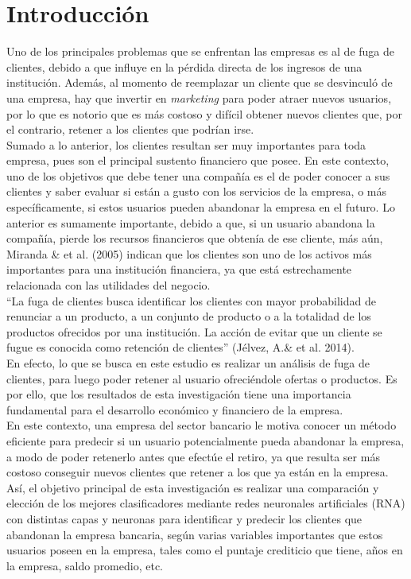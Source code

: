 \documentclass{report}
\begin{document}


\tableofcontents
\chapter{Introducción}\label{intro}
Uno de los principales problemas que se enfrentan las empresas es al de fuga de clientes, debido a que
influye en la pérdida directa de los ingresos de una institución. Además, al momento de reemplazar un cliente
que se desvinculó de una empresa, hay que invertir en \textit{marketing} para poder atraer nuevos usuarios, por lo
que es notorio que es más costoso y difícil obtener nuevos clientes que, por el contrario, retener a los clientes
que podrían irse.\\

Sumado a lo anterior, los clientes resultan ser muy importantes para toda empresa, pues son el principal sustento financiero que posee. En este contexto, uno de los objetivos que debe tener una compañía
es el de poder conocer a sus clientes y saber evaluar si están
a gusto con los servicios de la empresa, o más
específicamente, si estos usuarios pueden abandonar la
empresa en el futuro. Lo anterior es sumamente importante,
debido a que, si un usuario abandona la compañía, pierde
los recursos financieros que obtenía de ese cliente, más aún,
Miranda  \& et al. (2005) indican que los clientes son uno
de los activos más importantes para una institución
financiera, ya que está estrechamente relacionada con las
utilidades del negocio.\\

``La fuga de clientes busca identificar los clientes con mayor probabilidad de renunciar a un producto, a un conjunto de producto o a la totalidad de los productos ofrecidos por una institución. La acción de evitar que un cliente se fugue es conocida como retención de clientes” (Jélvez, A.\& et al. 2014).\\

En efecto, lo que se busca en este estudio es realizar un análisis de fuga de clientes, para luego poder retener al usuario ofreciéndole ofertas o productos. Es por ello, que los resultados de esta investigación tiene una importancia fundamental para el desarrollo económico y financiero de la empresa.\\



En este contexto, una empresa del sector bancario le motiva conocer un método eficiente para predecir si un usuario
potencialmente pueda abandonar la empresa, a modo de
poder retenerlo antes que efectúe el retiro, ya que resulta ser más costoso conseguir nuevos clientes que retener a los que ya están en la empresa. Así, el objetivo principal de esta investigación es realizar una comparación y elección de los mejores clasificadores mediante redes neuronales artificiales (RNA) con distintas capas y neuronas para identificar y predecir los clientes que abandonan la empresa bancaria, según varias variables importantes que estos usuarios poseen en la empresa, tales como el puntaje crediticio que tiene, años en la empresa, saldo promedio, etc.\\
\end{document}
